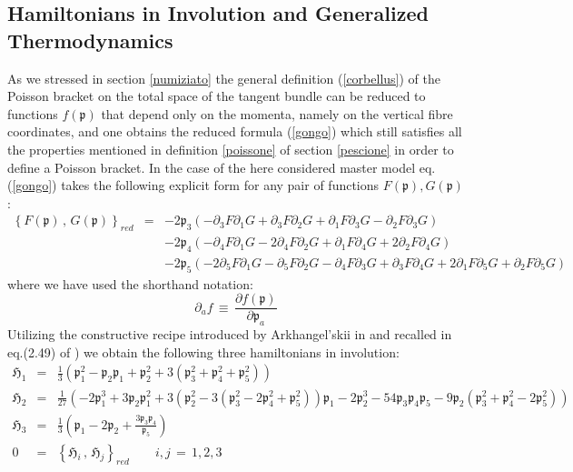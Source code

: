 \documentclass[10pt,a4paper]{article}
\begin{document}
\subsection{Hamiltonians in Involution and Generalized Thermodynamics}
As we stressed in section \ref{numiziato} the general definition (\ref{corbellus}) of the Poisson bracket on the total space of the tangent bundle can be reduced to functions $f(\mathfrak{p})$ that depend only on the momenta, namely on the vertical fibre coordinates, and one obtains the reduced formula (\ref{gongo}) which still satisfies all the properties mentioned in definition \ref{poissone} of section
\ref{pescione} in order to define a Poisson bracket. In the case of the here considered master model eq.(\ref{gongo}) takes the following explicit form for any pair of functions $F(\mathfrak{p}),G(\mathfrak{p})$:
\begin{eqnarray}
   \left\{F(\mathfrak{p})\, , \, G(\mathfrak{p})\right\}_{red} &=& -2 \mathfrak{p}_3 \left(-\partial_3 F \partial_1G+\partial_3 F \partial_2G+\partial_1F \partial_3G-\partial_2F \partial_3G\right)\nonumber\\
  &&-2 \mathfrak{p}_4
   \left(-\partial_4 F \partial_1G-2 \partial_4 F \partial_2G+\partial_1F \partial_4G+2 \partial_2F \partial_4G\right)\nonumber\\
   &&-2 \mathfrak{p}_5 \left(-2 \partial_5 F
   \partial_1G-\partial_5 F \partial_2G-\partial_4 F \partial_3G+\partial_3 F \partial_4G+2 \partial_1F \partial_5G+\partial_2F \partial_5G\right)
\end{eqnarray}
where we have used the shorthand notation:
\begin{equation}\label{notazia}
  \partial_{a}f \, \equiv \, \frac{\partial f(\mathfrak{p})}{\partial \mathfrak{p}_a}
\end{equation}
Utilizing the constructive recipe introduced by Arkhangel'skii in \cite{arcangelo} and recalled in eq.(2.49) of \cite{sashaebog}) we obtain the following three hamiltonians in involution:
\begin{eqnarray}
  \mathfrak{H}_1 &=& \frac{1}{3} \left(\mathfrak{p}_1^2-\mathfrak{p}_2 \mathfrak{p}_1+\mathfrak{p}_2^2+3
   \left(\mathfrak{p}_3^2+\mathfrak{p}_4^2+\mathfrak{p}_5^2\right)\right)\label{marino}\\
  \mathfrak{H}_2 &=&\frac{1}{27} \left(-2 \mathfrak{p}_1^3+3 \mathfrak{p}_2 \mathfrak{p}_1^2+3
   \left(\mathfrak{p}_2^2-3 \left(\mathfrak{p}_3^2-2
   \mathfrak{p}_4^2+\mathfrak{p}_5^2\right)\right) \mathfrak{p}_1-2 \mathfrak{p}_2^3-54
   \mathfrak{p}_3 \mathfrak{p}_4 \mathfrak{p}_5-9 \mathfrak{p}_2
   \left(\mathfrak{p}_3^2+\mathfrak{p}_4^2-2 \mathfrak{p}_5^2\right)\right)\label{montano} \\
  \mathfrak{H}_3 &=& \frac{1}{3} \left(\mathfrak{p}_1-2 \mathfrak{p}_2+\frac{3 \mathfrak{p}_3
   \mathfrak{p}_4}{\mathfrak{p}_5}\right)\label{desertico}\\
0&=& \left\{\mathfrak{H}_i\, , \, \mathfrak{H}_j\right\}_{red} \quad \quad i,j\, =\, 1,2,3\label{tundra}
\end{eqnarray}
\end{document}
